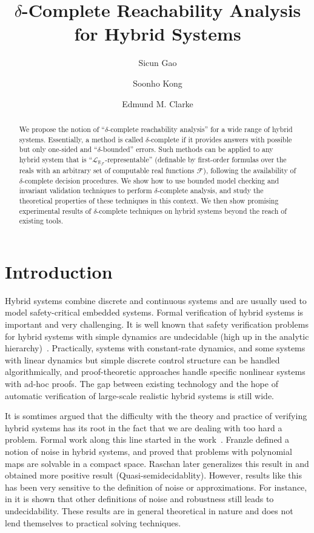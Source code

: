 \documentclass[envcountsect]{llncs}
\title{$\delta$-Complete Reachability Analysis for Hybrid Systems}
\author{Sicun Gao \and Soonho Kong \and Edmund M. Clarke}
\institute{Carnegie Mellon University, Pittsburgh, PA 15213}
\newcommand{\lrf}{\mathcal{L}_{\mathbb{R}_{\mathcal{F}}}}
\begin{document}
\maketitle

\begin{abstract}
We propose the notion of ``$\delta$-complete reachability analysis'' for a wide
range of hybrid systems. Essentially, a method is called $\delta$-complete if it
provides answers with possible but only one-sided  and ``$\delta$-bounded''
errors. Such methods can be applied to any hybrid system that is
``$\lrf$-representable'' (definable by first-order formulas over the reals with
an arbitrary set of computable real functions $\mathcal{F}$), following the
availability of $\delta$-complete decision procedures. We show how to use
bounded model checking and invariant validation techniques to perform
$\delta$-complete analysis, and study the theoretical properties of these
techniques in this context. We then show promising experimental results of
$\delta$-complete techniques on hybrid systems beyond the reach of existing
tools. 
\end{abstract}

\section{Introduction}

Hybrid systems combine discrete and continuous systems and are usually used to
model safety-critical embedded systems. Formal verification of hybrid systems is
important and very challenging. It is well known that safety verification
problems for hybrid systems with simple dynamics are undecidable (high up in the
analytic hierarchy)~\cite{}. Practically, systems with constant-rate dynamics,
and some systems with linear dynamics but simple discrete control structure can
be handled algorithmically, and proof-theoretic approaches handle specific
nonlinear systems with ad-hoc proofs. The gap between existing technology and
the hope of automatic verification of large-scale realistic hybrid systems is
still wide. 

It is somtimes argued that the difficulty with the theory and practice
of verifying hybrid systems has its root in the fact that we are dealing with
too hard a problem. Formal work along this line started in the work~\cite{}.
Franzle defined a notion of noise in hybrid systems, and proved that problems
with polynomial maps are solvable in a compact space. Raschan later generalizes
this result in \cite{} and obtained more positive result
(Quasi-semidecidablity). However, results like this has been very sensitive to
the definition of noise or approximations. For instance, in \cite{} it is shown
that other definitions of noise and robustness still leads to undecidability.
These results are in general theoretical in nature and does not lend themselves
to practical solving techniques. 
\end{document}
